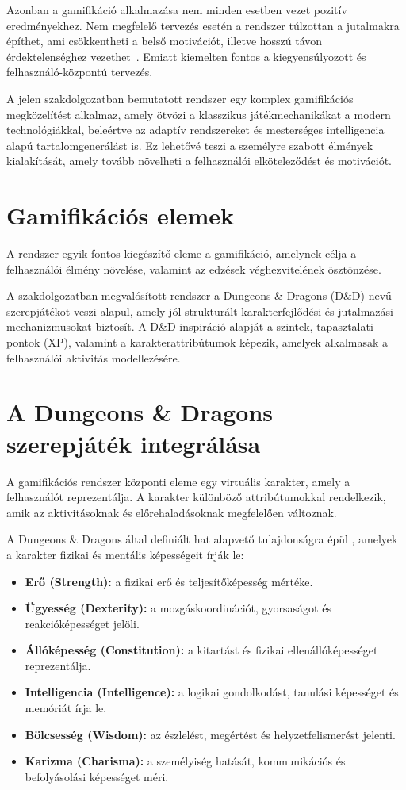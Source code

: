 \documentclass[
]{thesis-ekf}
\theoremstyle{definition}
\theoremstyle{remark}
\begin{document}
Azonban a gamifikáció alkalmazása nem minden esetben vezet pozitív eredményekhez. Nem megfelelő tervezés esetén a rendszer túlzottan a jutalmakra építhet, ami csökkentheti a belső motivációt, illetve hosszú távon érdektelenséghez vezethet~\cite{hanus2015assessing}. Emiatt kiemelten fontos a kiegyensúlyozott és felhasználó-központú tervezés.

A jelen szakdolgozatban bemutatott rendszer egy komplex gamifikációs megközelítést alkalmaz, amely ötvözi a klasszikus játékmechanikákat a modern technológiákkal, beleértve az adaptív rendszereket és mesterséges intelligencia alapú tartalomgenerálást is. Ez lehetővé teszi a személyre szabott élmények kialakítását, amely tovább növelheti a felhasználói elköteleződést és motivációt.

\section{Gamifikációs elemek}

A rendszer egyik fontos kiegészítő eleme a gamifikáció, amelynek célja a felhasználói élmény növelése, valamint az edzések véghezvitelének ösztönzése. 

A szakdolgozatban megvalósított rendszer a Dungeons \& Dragons (D\&D) nevű szerepjátékot veszi alapul, amely jól strukturált karakterfejlődési és jutalmazási mechanizmusokat biztosít. A D\&D inspiráció alapját a szintek, tapasztalati pontok (XP), valamint a karakterattribútumok képezik, amelyek alkalmasak a felhasználói aktivitás modellezésére.

\section{A Dungeons \& Dragons szerepjáték integrálása}

A gamifikációs rendszer központi eleme egy virtuális karakter, amely a felhasználót reprezentálja. A karakter különböző attribútumokkal rendelkezik, amik az aktivitásoknak és előrehaladásoknak megfelelően változnak.

A Dungeons \& Dragons által definiált hat alapvető tulajdonságra épül \cite[173.\ oldal]{dnd_player_handbook}, amelyek a karakter fizikai és mentális képességeit írják le:

\begin{itemize}
    \item \textbf{Erő (Strength):} a fizikai erő és teljesítőképesség mértéke.
    \item \textbf{Ügyesség (Dexterity):} a mozgáskoordinációt, gyorsaságot és reakcióképességet jelöli.
    \item \textbf{Állóképesség (Constitution):} a kitartást és fizikai ellenállóképességet reprezentálja.
    \item \textbf{Intelligencia (Intelligence):} a logikai gondolkodást, tanulási képességet és memóriát írja le.
    \item \textbf{Bölcsesség (Wisdom):} az észlelést, megértést és helyzetfelismerést jelenti.
    \item \textbf{Karizma (Charisma):} a személyiség hatását, kommunikációs és befolyásolási képességet méri.
\end{itemize}
\end{document}
